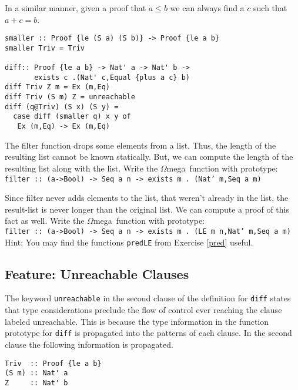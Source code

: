 \documentclass[11pt,twoside,A4]{llncs}
\newcommand{\om}{\emph{$\Omega$}mega}
\begin{document}
In a similar manner, given a proof that $a \leq b$ we can always find a $c$
such that $a+c=b$.
{\small
\begin{verbatim}
smaller :: Proof {le (S a) (S b)} -> Proof {le a b}
smaller Triv = Triv

diff:: Proof {le a b} -> Nat' a -> Nat' b -> 
       exists c .(Nat' c,Equal {plus a c} b)
diff Triv Z m = Ex (m,Eq)
diff Triv (S m) Z = unreachable
diff (q@Triv) (S x) (S y) =  
  case diff (smaller q) x y of
   Ex (m,Eq) -> Ex (m,Eq)
\end{verbatim}}

\begin{exercise}
The filter function drops some elements from a list. Thus, the length
of the resulting list cannot be known statically. But, we can
compute the length of the resulting list along with the list. Write
the \om\ function with prototype:\\
{\small {\tt filter :: (a->Bool) -> Seq a n -> exists m . (Nat' m,Seq a m)}}

Since filter never adds elements to the list, that weren't already
in the list, the result-list is never longer than the original list. We can compute 
a proof of this fact as well. Write
the \om\ function with prototype:\\
{\small {\tt filter :: (a->Bool) -> Seq a n -> exists m . (LE m n,Nat' m,Seq a m)}}\\
Hint: You may find the functions {\tt predLE} from
Exercise \ref{pred} useful.
\end{exercise}

\subsection{Feature: Unreachable Clauses}\label{unreachable}

The keyword {\tt unreachable} in the second clause of the definition
for {\tt diff} states that type considerations
preclude the flow of control ever reaching the clause labeled unreachable.
This is because the type information in the function prototype for {\tt diff}
is propagated into the patterns of each clause. In the second
clause the following information is propagated.

{\small
\begin{verbatim}
Triv  :: Proof {le a b}
(S m) :: Nat' a
Z     :: Nat' b 
\end{verbatim}}
\end{document}

